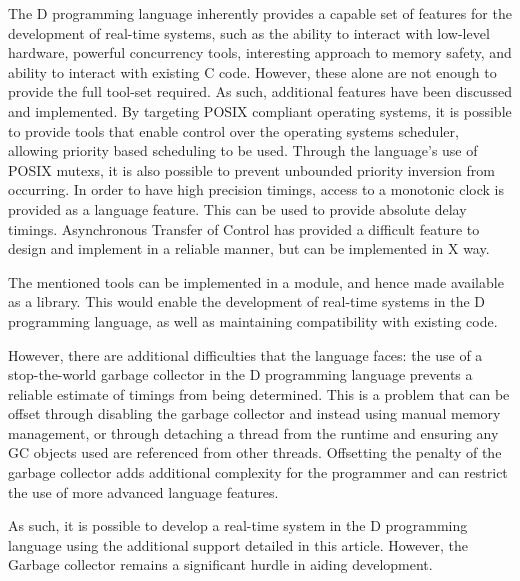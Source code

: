 
The D programming language inherently provides a capable set of features for the 
development of real-time systems, such as the ability to interact with low-level 
hardware, powerful concurrency tools, interesting approach to memory 
safety, and ability to interact with existing C code. 
However, these alone are not enough to provide the full tool-set required. As such, 
additional features have been discussed and implemented. 
By targeting POSIX compliant operating systems, it is possible 
to provide tools that enable control over the operating systems scheduler, 
allowing priority based scheduling to be used. 
Through the 
language's use of POSIX mutexs, it is also possible to prevent unbounded 
priority inversion from occurring.
In order to have high precision timings, access to a monotonic clock is provided 
as a language feature. This can be used to provide absolute delay timings. 
Asynchronous Transfer of Control has provided a difficult feature to design and 
implement in a reliable manner, but can be implemented in X way.
\par\bigskip\noindent
The mentioned tools can be implemented in a module, and hence made available as 
a library. 
This would enable the development of real-time systems in the D programming 
language, as well as maintaining compatibility with existing code. 
\par\bigskip\noindent
However, there are additional difficulties that the 
language faces: the use of a stop-the-world garbage collector in the 
D programming language prevents a reliable estimate of timings from being determined. 
This is a problem that can be offset through disabling the garbage collector 
and instead using manual memory management, or through detaching a thread from the 
runtime and ensuring any GC objects used are referenced from other threads.
Offsetting the penalty of the garbage collector adds additional complexity for 
the programmer and can restrict the use of more advanced language features. 
\par\bigskip\noindent
As such, it is possible to develop a real-time system in the D programming 
language using the additional support detailed in this article. However, 
the Garbage collector remains a significant hurdle in aiding development.
